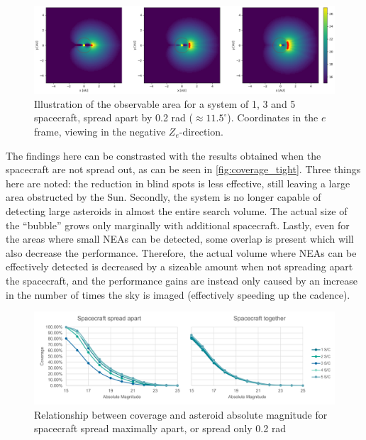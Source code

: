 \begin{figure}[htbp]
 \centering
 \includegraphics[width=1.0\textwidth]{img/coverage_tight.png}
 \caption{Illustration of the observable area for a system of 1, 3 and 5 spacecraft, spread apart by 0.2 rad ($\approx 11.5^\circ$). Coordinates in the $e$ frame, viewing in the negative $Z_e$-direction.}
 \label{fig:coverage_tight}
\end{figure}


The findings here can be constrasted with the results obtained when the spacecraft are not spread out, as can be seen in \autoref{fig:coverage_tight}. Three things here are noted: the reduction in blind spots is less effective, still leaving a large area obstructed by the Sun. Secondly, the system is no longer capable of detecting large asteroids in almost the entire search volume. The actual size of the ``bubble'' grows only marginally with additional spacecraft. Lastly, even for the areas where small NEAs can be detected, some overlap is present which will also decrease the performance. Therefore, the actual volume where NEAs can be effectively detected is decreased by a sizeable amount when not spreading apart the spacecraft, and the performance gains are instead only caused by an increase in the number of times the sky is imaged (effectively speeding up the cadence).\\

\begin{figure}[htbp]
 \centering
 \includegraphics[width=1.0\textwidth]{img/spread_coverage.pdf}
 \caption{Relationship between coverage and asteroid absolute magnitude for spacecraft spread maximally apart, or spread only 0.2 rad}
 \label{fig:spread_coverage}
\end{figure}

